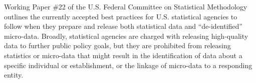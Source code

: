 

Working Paper \#22 of the U.S. Federal Committee on Statistical
Methodology\cite{workingpaper22} outlines the currently accepted best
practices for U.S. statistical agencies to follow when they prepare and
release both statistical data and ``de-identified''
micro-data. Broadly, statistical agencies are charged with releasing
high-quality data to further public policy goals, but they are
prohibited from releasing statistics or micro-data that might result in the
identification of data about a specific individual or establishment, or the linkage
of micro-data to a responding entity.

